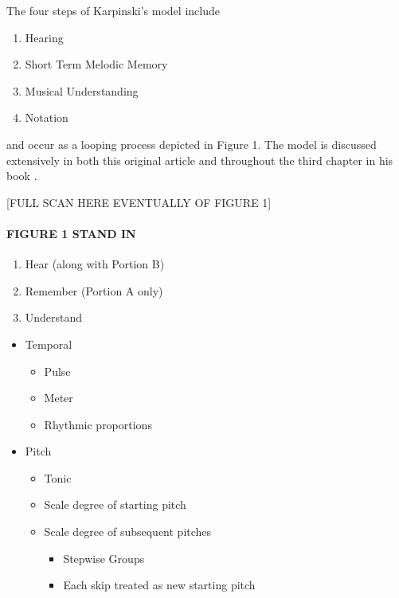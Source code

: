 \documentclass[]{book}
\providecommand{\tightlist}{%
  \setlength{\itemsep}{0pt}\setlength{\parskip}{0pt}}
\let\oldparagraph\paragraph
\renewcommand{\paragraph}[1]{\oldparagraph{#1}\mbox{}}
\theoremstyle{definition}
\theoremstyle{definition}
\theoremstyle{definition}
\theoremstyle{remark}
\begin{document}
The four steps of Karpinski's model include

\begin{enumerate}
\def\labelenumi{\arabic{enumi}.}
\tightlist
\item
  Hearing
\item
  Short Term Melodic Memory
\item
  Musical Understanding
\item
  Notation
\end{enumerate}

and occur as a looping process depicted in Figure 1. The model is
discussed extensively in both this original article
\citep{karpinskiModelMusicPerception1990} and throughout the third
chapter in his book \citep{karpinskiAuralSkillsAcquisition2000}.

{[}FULL SCAN HERE EVENTUALLY OF FIGURE 1{]}

\hypertarget{figure-1-stand-in}{%
\paragraph{FIGURE 1 STAND IN}\label{figure-1-stand-in}}

\begin{enumerate}
\def\labelenumi{\arabic{enumi}.}
\tightlist
\item
  Hear (along with Portion B)
\item
  Remember (Portion A only)
\item
  Understand
\end{enumerate}

\begin{itemize}
\tightlist
\item
  Temporal

  \begin{itemize}
  \tightlist
  \item
    Pulse
  \item
    Meter
  \item
    Rhythmic proportions
  \end{itemize}
\item
  Pitch

  \begin{itemize}
  \tightlist
  \item
    Tonic
  \item
    Scale degree of starting pitch
  \item
    Scale degree of subsequent pitches

    \begin{itemize}
    \tightlist
    \item
      Stepwise Groups
    \item
      Each skip treated as new starting pitch
    \end{itemize}
  \end{itemize}
\end{itemize}
\end{document}
